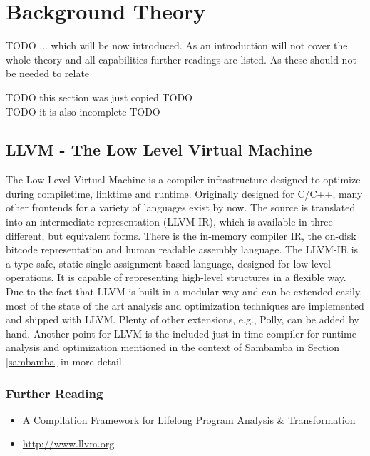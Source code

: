 
\chapter{Background Theory} %
\label{Chapter2}

TODO ...  which will be now introduced. 
As an introduction will not cover the whole theory and all capabilities 
further readings are listed. As these should not be needed to relate 

\begin{center}
TODO this section was just copied TODO \\
TODO it is also incomplete TODO 
\end{center}




\section{LLVM - The Low Level Virtual Machine}
\label{LLVM}
The Low Level Virtual Machine is a compiler infrastructure designed to optimize
during compiletime, linktime and runtime. Originally designed for C/C++, 
many other frontends for a variety of languages exist by now. The source is 
translated into an intermediate representation (LLVM-IR), which is available 
in three different, but equivalent forms. There is the in-memory compiler IR, 
the on-disk bitcode representation and human readable assembly language.
The LLVM-IR is a type-safe, static single assignment based language,
designed for low-level operations. It is capable of 
representing high-level structures in a flexible way.
Due to the fact that LLVM is built in a modular 
way and can be extended easily, most of the state of the art analysis and
optimization techniques are implemented and shipped with LLVM. Plenty of other
extensions, e.g., Polly, can be added by hand. 
Another point for LLVM is the 
included just-in-time compiler for runtime analysis and optimization mentioned
in the context of Sambamba in Section \ref{sambamba} in more detail.

\subsection*{Further Reading}

\begin{itemize}
  \item A Compilation Framework for Lifelong Program Analysis \& Transformation
    \cite{LLVM:CGO04}  
  \item \url{http://www.llvm.org} \nocite{LLVM:Online}
\end{itemize}

